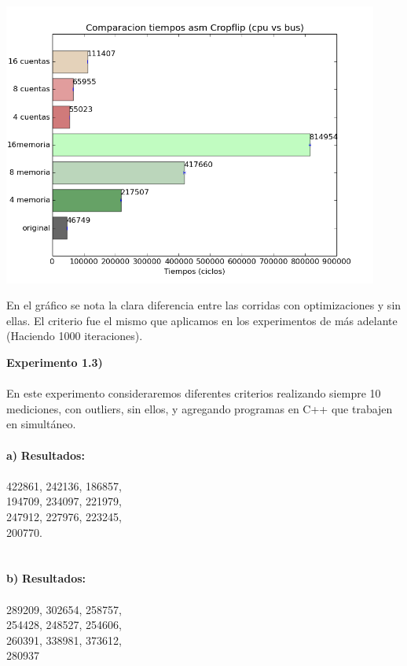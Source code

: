 \documentclass[a4paper]{article}
\begin{document}
\includegraphics[width=350pt]{imagenes/cropCompC.png}

En el gr\'{a}fico se nota la clara diferencia entre las corridas con optimizaciones y sin ellas. El criterio fue el mismo que aplicamos en los experimentos de m\'{a}s adelante (Haciendo 1000 iteraciones).

\newpage

\textbf{Experimento 1.3)}\\ \\ 
En este experimento consideraremos diferentes criterios realizando siempre 10 mediciones, con outliers, sin ellos, y agregando programas en C++ que trabajen en simult\'{a}neo.\\ \\

\noindent \textbf{a)} \indent \textbf{Resultados:}\\ \\ 422861, 242136, 186857,\\ 194709, 234097, 221979,\\ 247912, 227976, 223245,\\ 200770.\\ \\ \\

\noindent\textbf{b)} \indent \textbf{Resultados:}\\ \\ 289209, 302654, 258757,\\ 254428, 248527, 254606,\\ 260391, 338981, 373612,\\ 280937 \\ \\ \\
\end{document}
